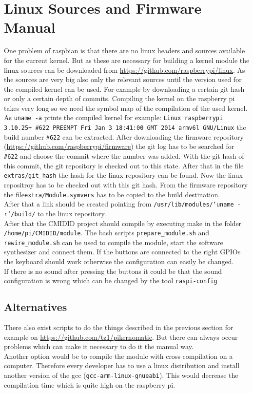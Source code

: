 \documentclass[paper=a4,fontsize=11pt,twocolumn,pagesize,bibtotoc]{scrartcl}
\begin{document}
\section{Linux Sources and Firmware Manual}
One problem of raspbian is that there are no linux headers and sources available for the current kernel.
But as these are necessary for building a kernel module the linux sources can be downloaded from \url{https://github.com/raspberrypi/linux}. 
As the sources are very big also only the relevant sources until the version used for the compiled kernel can be used. For example by downloading a certain git hash or only a certain depth of commits.
Compiling the kernel on the raspberry pi takes very long so we need the symbol map of the compilation of the used kernel.
As \texttt{uname -a} prints the compiled kernel for example: \texttt{Linux raspberrypi 3.10.25+ \#622 PREEMPT Fri Jan 3 18:41:00 GMT 2014 armv6l GNU/Linux} the build number \texttt{\#622} can be extracted.
After downloading the firmware repository (\url{https://github.com/raspberrypi/firmware}) the git log has to be searched for \texttt{\#622} and choose the commit where the number was added.
With the git hash of this commit, the git repository is checked out to this state. After that in the file \texttt{extras/git\_hash} the hash for the linux repository can be found. Now the linux repositroy has to be checked out with this git hash. From the firmware repository the file\texttt{extra/Module.symvers} has to be copied to the build destination.\cite{linuxsrc}\\
After that a link should be created pointing from \texttt{/usr/lib/modules/`uname -r`/build/} to the linux repository. \\
After that the CMIDID project should compile by executing make in the folder \texttt{/home/pi/CMIDID/module}. 
The bash scripts \texttt{prepare\_module.sh} and \texttt{rewire\_module.sh} can be used to compile the module, start the software synthesizer and connect them.
 If the buttons are connected to the right GPIOs the keyboard should work otherwise the configuration can easily be changed.\\
If there is no sound after pressing the buttons it could be that the sound configuration is wrong which can be changed by the tool \texttt{raspi-config}
\subsection{Alternatives}
There also exist scripts to do the things described in the previous section for example on \url{https://github.com/tz1/pikernomatic}. But there can always occur problems which can make it necessary to do it the manual way.\\
Another option would be to compile the module with cross compilation on a computer. Therefore every developer has to use a linux distribution and install another version of the gcc (\texttt{gcc-arm-linux-gnueabi}). This would decrease the compilation time which is quite high on the raspberry pi.
\end{document}

